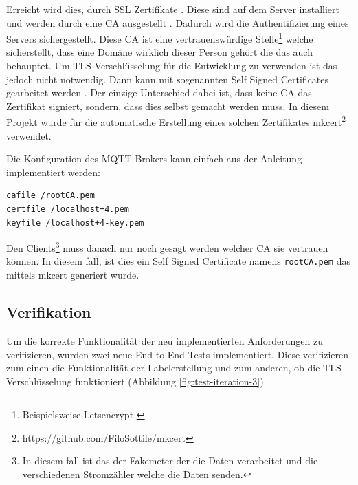 Erreicht wird dies, durch SSL Zertifikate \parencite{what_is_ssl_certificate}. Diese sind auf dem Server
installiert und werden durch eine \ac{CA} ausgestellt \parencite{what_is_ca}.
Dadurch wird die Authentifizierung eines Servers sichergestellt.
Diese \ac{CA} ist eine vertrauenswürdige Stelle\footnote{
    Beispielsweise Letsencrypt \parencite{letsencrypt_2021}
} welche sicherstellt, dass eine Domäne wirklich dieser Person gehört die das auch behauptet.
Um \ac{TLS} Verschlüsselung für die Entwicklung zu verwenden ist das jedoch nicht notwendig.
Dann kann mit sogenannten Self Signed Certificates gearbeitet werden \parencite{self_signed_cert}.
Der einzige Unterschied dabei ist, dass keine \ac{CA} das Zertifikat signiert, sondern, dass
dies selbst gemacht werden muss. In diesem Projekt wurde für die automatische Erstellung eines solchen
Zertifikates mkcert\footnote{https://github.com/FiloSottile/mkcert} verwendet.

Die Konfiguration des \ac{MQTT} Brokers kann einfach aus der Anleitung \parencite{mosquitto.conf_man_page_2021}
implementiert werden:

\begin{verbatim}
cafile /rootCA.pem
certfile /localhost+4.pem
keyfile /localhost+4-key.pem
\end{verbatim}

Den Clients\footnote{
    In diesem fall ist das der Fakemeter der die Daten verarbeitet und die verschiedenen
    Stromzähler welche die Daten senden.
} muss danach nur noch gesagt werden welcher \ac{CA} sie vertrauen können.
In diesem fall, ist dies ein Self Signed Certificate namens \texttt{rootCA.pem} das mittels
mkcert generiert wurde.

\subsection{Verifikation}

Um die korrekte Funktionalität der neu implementierten Anforderungen zu verifizieren, wurden
zwei neue End to End Tests implementiert. Diese verifizieren zum einen die Funktionalität der
Labelerstellung und zum anderen, ob die \ac{TLS} Verschlüsselung funktioniert (Abbildung \ref{fig:test-iteration-3}).


